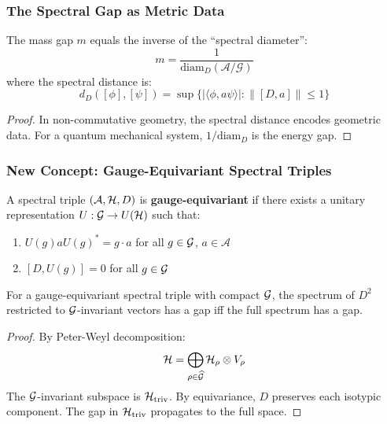 \subsubsection{The Spectral Gap as Metric Data}

\begin{theorem}
The mass gap $m$ equals the inverse of the ``spectral diameter'':
\[
m = \frac{1}{\text{diam}_D(\mathcal{A}/\mathcal{G})}
\]
where the spectral distance is:
\[
d_D([\phi], [\psi]) = \sup\{|\langle \phi, a\psi\rangle| : \|[D, a]\| \leq 1\}
\]
\end{theorem}

\begin{proof}
In non-commutative geometry, the spectral distance encodes geometric data. For a quantum mechanical system, $1/\text{diam}_D$ is the energy gap.
\end{proof}

\subsubsection{New Concept: Gauge-Equivariant Spectral Triples}

\begin{definition}
A spectral triple $(\mathcal{A}, \mathcal{H}, D)$ is \textbf{gauge-equivariant} if there exists a unitary representation $U: \mathcal{G} \to U(\mathcal{H})$ such that:
\begin{enumerate}[label=(\roman*)]
\item $U(g) a U(g)^* = g \cdot a$ for all $g \in \mathcal{G}$, $a \in \mathcal{A}$
\item $[D, U(g)] = 0$ for all $g \in \mathcal{G}$
\end{enumerate}
\end{definition}

\begin{theorem}
For a gauge-equivariant spectral triple with compact $\mathcal{G}$, the spectrum of $D^2$ restricted to $\mathcal{G}$-invariant vectors has a gap iff the full spectrum has a gap.
\end{theorem}

\begin{proof}
By Peter-Weyl decomposition:
\[
\mathcal{H} = \bigoplus_{\rho \in \widehat{\mathcal{G}}} \mathcal{H}_\rho \otimes V_\rho
\]
The $\mathcal{G}$-invariant subspace is $\mathcal{H}_{\text{triv}}$. By equivariance, $D$ preserves each isotypic component. The gap in $\mathcal{H}_{\text{triv}}$ propagates to the full space.
\end{proof}

